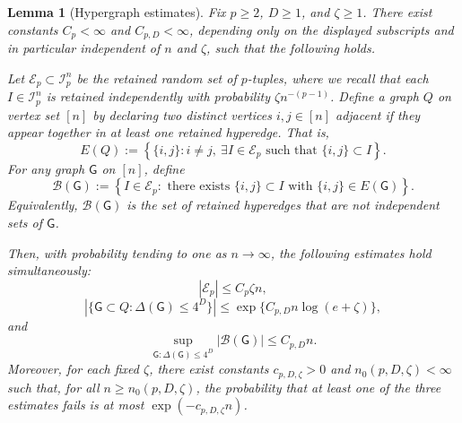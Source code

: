 \documentclass[12pt]{article}
\newtheorem{lemma}[theorem]{Lemma}
\newcommand{\mcB}{\mathcal{B}}
\newcommand{\mcE}{\mathcal{E}}
\newcommand{\mcI}{\mathcal{I}}
\begin{document}
\begin{lemma}[Hypergraph estimates]
\label{lem:zeta-good-event}
Fix \(p\ge2\), \(D\ge1\), and \(\zeta\ge1\). There exist constants
\(C_p<\infty\) and \(C_{p,D}<\infty\), depending only on the displayed subscripts and in particular independent of \(n\) and \(\zeta\), such that the following holds.

Let \(\mcE_p\subset\mcI_p^n\) be the retained random set of $p$-tuples, where we recall that each \(I\in\mcI_p^n\) is retained independently with probability
\(\zeta n^{-(p-1)}\). Define a graph \(Q\) on vertex set \([n]\) by declaring
two distinct vertices \(i,j\in[n]\) adjacent if they appear together in at
least one retained hyperedge. That is,
\[
    E(Q)
    :=
    \left\{
    \{i,j\}: i\neq j,\ \exists I\in\mcE_p
    \text{ such that } \{i,j\}\subset I
    \right\}.
\]
For any graph \(\mathsf G\) on \([n]\), define
\[
    \mcB(\mathsf G)
    :=
    \left\{
    I\in\mcE_p:
    \text{ there exists }\{i,j\}\subset I
    \text{ with } \{i,j\}\in E(\mathsf G)
    \right\}.
\]
Equivalently, \(\mcB(\mathsf G)\) is the set of retained hyperedges that are
not independent sets of \(\mathsf G\).

Then, with probability tending to one as \(n\to\infty\), the following
estimates hold simultaneously:
\[
    |\mcE_p|\le C_p\zeta n,
\]
\[
    |\{\mathsf G\subset Q:\Delta(\mathsf G)\le4^D\}|
    \le
    \exp\{C_{p,D}n\log(e+\zeta)\},
\]
and
\[
    \sup_{\mathsf G:\Delta(\mathsf G)\le4^D}
    |\mcB(\mathsf G)|
    \le
    C_{p,D}n.
\]
Moreover, for each fixed \(\zeta\), there exist constants
\(c_{p,D,\zeta}>0\) and \(n_0(p,D,\zeta)<\infty\) such that, for all
\(n\ge n_0(p,D,\zeta)\), the probability that at least one of the three estimates fails is at most \(\exp(-c_{p,D,\zeta}n)\).
\end{lemma}
\end{document}
